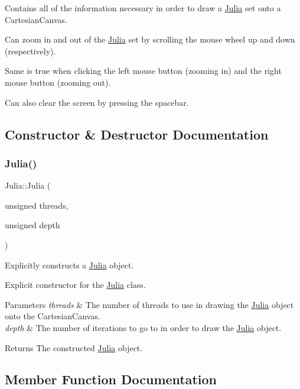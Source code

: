 Contains all of the information necessary in order to draw a \hyperlink{class_julia}{Julia} set onto a Cartesian\+Canvas.

Can zoom in and out of the \hyperlink{class_julia}{Julia} set by scrolling the mouse wheel up and down (respectively).

Same is true when clicking the left mouse button (zooming in) and the right mouse button (zooming out).

Can also clear the screen by pressing the spacebar. 

\subsection{Constructor \& Destructor Documentation}
\mbox{\label{class_julia_a8bc853f8129d8f2503bbda1236f64b36}} 
\subsubsection{\texorpdfstring{Julia()}{Julia()}}
{\footnotesize\ttfamily Julia\+::\+Julia (\begin{DoxyParamCaption}\item[{unsigned}]{threads,  }\item[{unsigned}]{depth }\end{DoxyParamCaption})}



Explicitly constructs a \hyperlink{class_julia}{Julia} object. 

Explicit constructor for the \hyperlink{class_julia}{Julia} class. 
\begin{DoxyParams}{Parameters}
{\em threads} & The number of threads to use in drawing the \hyperlink{class_julia}{Julia} object onto the Cartesian\+Canvas. \\
\hline
{\em depth} & The number of iterations to go to in order to draw the \hyperlink{class_julia}{Julia} object. \\
\hline
\end{DoxyParams}
\begin{DoxyReturn}{Returns}
The constructed \hyperlink{class_julia}{Julia} object. 
\end{DoxyReturn}


\subsection{Member Function Documentation}
\mbox{\label{class_julia_ab877233424159ca87da6dcf0f0f36e51}} 
